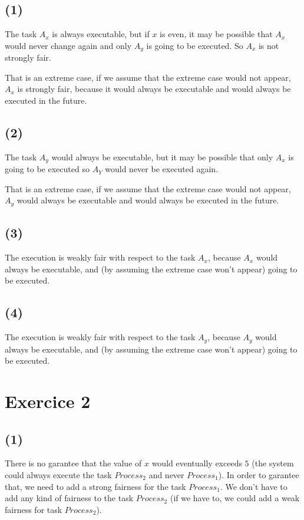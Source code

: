 \documentclass[a4paper,11pt]{report}
\begin{document}
\subsection*{(1)}

The task $A_x$ is always executable, but if $x$ is even, it may be possible that
$A_x$ would never change again and only $A_y$ is going to be executed. So $A_x$
is not strongly fair.

That is an extreme case, if we assume that the extreme case would not appear,
$A_x$ is strongly fair, because it would always be executable and would always
be executed in the future.


\subsection*{(2)}

The task $A_y$ would always be executable, but it may be possible that only
$A_x$ is going to be executed so $A_Y$ would never be executed again.

That is an extreme case, if we assume that the extreme case would not appear,
$A_y$ would always be executable and would always be executed in the future.

\subsection*{(3)}

The execution is weakly fair with respect to the task $A_x$, because $A_x$ would
always be executable, and (by assuming the extreme case won't appear) going to
be executed.

\subsection*{(4)}

The execution is weakly fair with respect to the task $A_y$, because $A_y$ would
always be executable, and (by assuming the extreme case won't appear) going to
be executed.

\section*{Exercice 2}

\subsection*{(1)}

There is no garantee that the value of $x$ would eventually exceeds $5$ (the
system could always execute the task $Process_2$ and never $Process_1$). In
order to garantee that, we need to add a strong fairness for the task
$Process_1$. We don't have to add any kind of fairness to the task $Process_2$
(if we have to, we could add a weak fairness for task $Process_2$).
\end{document}
